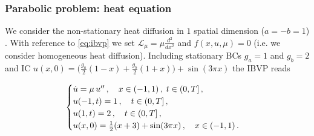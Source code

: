 \documentclass[../main.tex]{subfiles}
\begin{document}
\subsubsection{Parabolic problem: heat equation}\label{subsubsec:heat}

We consider the non-stationary heat diffusion in $1$ spatial dimension ($a=-b=1$) .
With reference to \eqref{eq:ibvp} we set $\mathcal{L}_{\mu} = \mu\frac{d^{2}}{dx^{2}}$ and $f(x,u,\mu) = 0$ (i.e. we consider homogeneous heat diffusion).
Including stationary BCs $g_{a}=1$ and $g_{b}=2$ and IC $u(x,0)=\Big(\frac{g_{a}}{2}(1-x)+\frac{g_{b}}{2}(1+x)\Big) + \sin(3\pi x)$ the IBVP reads 

\begin{equation}\label{eq:heat}
   \begin{cases}
           \dot{u} = \mu\,u'' \,,\quad x\in(-1,1)\,,\;t\in(0,T]\,, \\
           u(-1,t) = 1\,, \quad t\in(0,T]\,, \\
           u(1,t) = 2\,, \quad t\in(0,T]\,, \\ 
           u(x,0) = \frac{1}{2}(x+3) + \sin(3\pi x)\,, \quad x\in(-1,1)\,. 
   \end{cases}
\end{equation}
\end{document}
